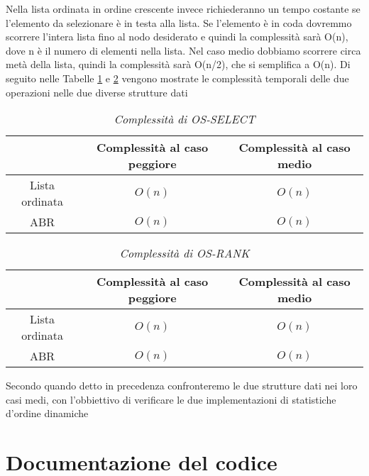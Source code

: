 \documentclass{article}
\begin{document}
Nella lista ordinata in ordine crescente invece richiederanno un tempo costante se l'elemento da selezionare è in testa alla lista. Se l'elemento è in coda dovremmo scorrere l'intera lista fino al nodo desiderato e quindi la complessità sarà O(n), dove n è il numero di elementi nella lista. Nel caso medio dobbiamo scorrere circa metà della lista, quindi la complessità sarà O(n/2), che si semplifica a O(n).
Di seguito nelle Tabelle \ref{os_select_comp} e \ref{os_rank_comp} vengono mostrate le complessità temporali delle due operazioni nelle due diverse strutture dati
\vspace{1cm}
\begin{table}[H]
    \centering
    \begin{tabular}{|c|c|c|}
    \hline
     & \textbf{Complessità al caso peggiore} & \textbf{Complessità al caso medio}\\
    \hline
    Lista ordinata & $O(n)$ & $O(n)$\\
    \hline
    ABR & $O(n)$ & $O(n)$\\
    \hline
    \end{tabular}
    \caption{\textit{Complessità di OS-SELECT}}
    \label{os_select_comp}
\end{table}
\vspace{0.5cm}
\begin{table}[H]
    \centering
    \begin{tabular}{|c|c|c|}
    \hline
     & \textbf{Complessità al caso peggiore} & \textbf{Complessità al caso medio}\\
    \hline
    Lista ordinata & $O(n)$ & $O(n)$\\
    \hline
    ABR & $O(n)$ & $O(n)$\\
    \hline
    \end{tabular}
    \caption{\textit{Complessità di OS-RANK}}
    \label{os_rank_comp}
\end{table}
\vspace{0.5cm}
Secondo quando detto in precedenza confronteremo le due strutture dati nei loro casi medi, con l'obbiettivo di verificare le due implementazioni di statistiche d'ordine dinamiche
\newpage
\section{Documentazione del codice}
\end{document}
